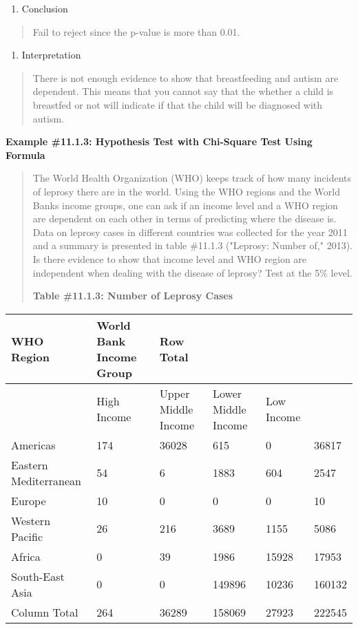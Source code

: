 \documentclass[]{book}
\providecommand{\tightlist}{%
  \setlength{\itemsep}{0pt}\setlength{\parskip}{0pt}}
\begin{document}
\begin{enumerate}
\def\labelenumi{\arabic{enumi}.}
\setcounter{enumi}{3}
\tightlist
\item
  Conclusion
\end{enumerate}

\begin{quote}
Fail to reject since the p-value is more than 0.01.
\end{quote}

\begin{enumerate}
\def\labelenumi{\arabic{enumi}.}
\setcounter{enumi}{4}
\tightlist
\item
  Interpretation
\end{enumerate}

\begin{quote}
There is not enough evidence to show that breastfeeding and autism are dependent. This means that you cannot say that the whether a child is breastfed or not will indicate if that the child will be diagnosed with autism.
\end{quote}

\textbf{Example \#11.1.3: Hypothesis Test with Chi-Square Test Using Formula}

\begin{quote}
The World Health Organization (WHO) keeps track of how many incidents of leprosy there are in the world. Using the WHO regions and the World Banks income groups, one can ask if an income level and a WHO region are dependent on each other in terms of predicting where the disease is. Data on leprosy cases in different countries was collected for the year 2011 and a summary is presented in table \#11.1.3 ("Leprosy: Number of," 2013). Is there evidence to show that income level and WHO region are independent when dealing with the disease of leprosy? Test at the 5\% level.

\textbf{Table \#11.1.3: Number of Leprosy Cases}
\end{quote}

\begin{longtable}[]{@{}llllll@{}}
\toprule
WHO Region & World Bank Income Group & Row Total & & &\tabularnewline
\midrule
\endhead
& High Income & Upper Middle Income & Lower Middle Income & Low Income &\tabularnewline
Americas & 174 & 36028 & 615 & 0 & 36817\tabularnewline
Eastern Mediterranean & 54 & 6 & 1883 & 604 & 2547\tabularnewline
Europe & 10 & 0 & 0 & 0 & 10\tabularnewline
Western Pacific & 26 & 216 & 3689 & 1155 & 5086\tabularnewline
Africa & 0 & 39 & 1986 & 15928 & 17953\tabularnewline
South-East Asia & 0 & 0 & 149896 & 10236 & 160132\tabularnewline
Column Total & 264 & 36289 & 158069 & 27923 & 222545\tabularnewline
\bottomrule
\end{longtable}
\end{document}
